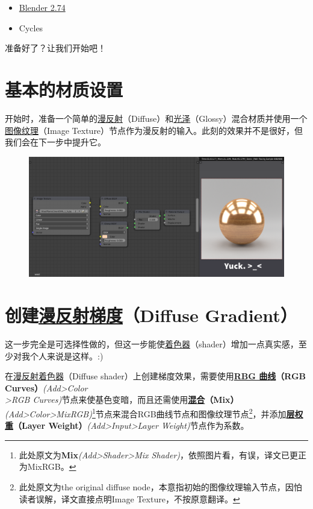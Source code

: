 \documentclass[11pt,a4paper,UTF8]{ctexart}
\begin{document}
\begin{itemize}
   \item \href{http://blender.org/}{Blender 2.74}
   \item Cycles
\end{itemize}

准备好了？让我们开始吧！

\newpage
\section{基本的材质设置}
开始时，准备一个简单的\underline{漫反射}（Diffuse）和\underline{光泽}（Glossy）混合材质并使用一个\underline{图像纹理}（Image Texture）节点作为漫反射的输入。此刻的效果并不是很好，但我们会在下一步中提升它。

\begin{figure}[hb]
    \centering
    \includegraphics[scale=0.41]{step1}
\end{figure}

\section{创建\underline{漫反射梯度}（Diffuse Gradient）}
这一步完全是可选择性做的，但这一步能使\underline{着色器}（shader）增加一点真实感，至少对我个人来说是这样。:)

在\underline{漫反射着色器}（Diffuse shader）上创建梯度效果，需要使用\textbf{\underline{RBG 曲线}（RGB Curves）}\emph{(Add>Color\\>RGB Curves)}节点来使基色变暗，而且还需使用\textbf{\underline{混合}（Mix）}\emph{(Add>Color>MixRGB)}\footnote{此处原文为\textbf{Mix}\emph{(Add>Shader>Mix Shader)}，依照图片看，有误，译文已更正为MixRGB。}节点来混合RGB曲线节点和图像纹理节点\footnote{此处原文为the original diffuse node，本意指初始的图像纹理输入节点，因怕读者误解，译文直接点明Image Texture，不按原意翻译。}，并添加\textbf{\underline{层权重}（Layer Weight）}\emph{(Add>Input>Layer Weight)}节点作为系数。
\end{document}
